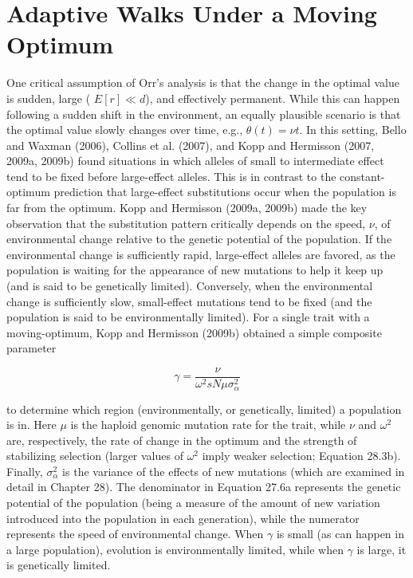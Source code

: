 \documentclass{article}
\begin{document}
\section{Adaptive Walks Under a Moving Optimum}
One critical assumption of Orr’s analysis is that the change in the optimal value is sudden, large ( $ E[r] \ll d $), and effectively permanent. While this can happen following a sudden shift in the environment, an equally plausible scenario is that the optimal value slowly changes over time, e.g.,  $ \theta(t) = \nu t $. In this setting, Bello and Waxman (2006), Collins et al. (2007), and Kopp and Hermisson (2007, 2009a, 2009b) found situations in which alleles of small to intermediate effect tend to be fixed before large-effect alleles. This is in contrast to the constant-optimum prediction that large-effect substitutions occur when the population is far from the optimum. Kopp and Hermisson (2009a, 2009b) made the key observation that the substitution pattern critically depends on the speed,  $ \nu $, of environmental change relative to the genetic potential of the population. If the environmental change is sufficiently rapid, large-effect alleles are favored, as the population is waiting for the appearance of new mutations to help it keep up (and is said to be genetically limited). Conversely, when the environmental change is sufficiently slow, small-effect mutations tend to be fixed (and the population is said to be environmentally limited). For a single trait with a moving-optimum, Kopp and Hermisson (2009b) obtained a simple composite parameter

\begin{equation}
\gamma=\frac{\nu}{\omega^{2}s N\mu\sigma_{\alpha}^{2}}
\tag{27.6a}
\label{eq:27_6a}
\end{equation}

to determine which region (environmentally, or genetically, limited) a population is in. Here  $ \mu $ is the haploid genomic mutation rate for the trait, while  $ \nu $ and  $ \omega^2 $ are, respectively, the rate of change in the optimum and the strength of stabilizing selection (larger values of  $ \omega^2 $ imply weaker selection; Equation 28.3b). Finally,  $ \sigma_\alpha^2 $ is the variance of the effects of new mutations (which are examined in detail in Chapter 28). The denominator in Equation 27.6a represents the genetic potential of the population (being a measure of the amount of new variation introduced into the population in each generation), while the numerator represents the speed of environmental change. When  $ \gamma $ is small (as can happen in a large population), evolution is environmentally limited, while when  $ \gamma $ is large, it is genetically limited.
\end{document}
